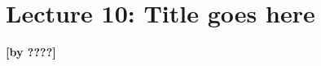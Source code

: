 
\section{Lecture 10: Title goes here}
\label{sec:lecture10}
\begin{flushright}\textbf{[by ????]}\end{flushright}


